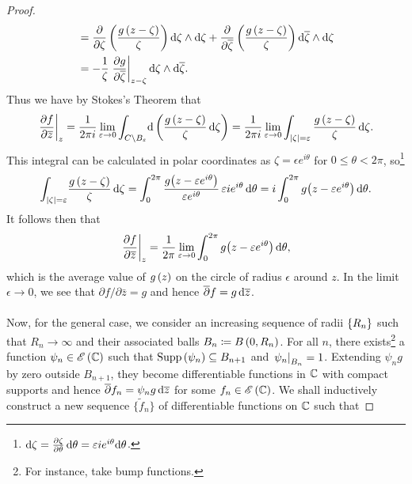 \documentclass[../Moduli_Spaces_of_Riemann_Surfaces.tex]{subfiles}
\begin{document}
\begin{proof}
\begin{equation*}
\begin{aligned}
                   &=\frac{\partial}{\partial\zeta}\left(\frac{g\left(z-\zeta\right)}{\zeta}\right)\mathrm{d}\zeta\wedge\mathrm{d}\zeta+\frac{\partial}{\partial\overline{\zeta}}\left(\frac{g\left(z-\zeta\right)}{\zeta}\right)\mathrm{d}\overline{\zeta}\wedge\mathrm{d}\zeta \\
                   &=-\frac{1}{\zeta}\left.\frac{\partial g}{\partial\overline{\zeta}}\right|_{z-\zeta}\mathrm{d}\zeta\wedge\mathrm{d}\overline{\zeta}.
            \end{aligned}
        \end{equation*}
        Thus we have by Stokes's Theorem that
        \begin{equation*}
            \left.\frac{\partial f}{\partial\overline{z}}\right|_z=\frac{1}{2\pi i}\lim\limits_{\varepsilon\to0}\int_{C\setminus B_\varepsilon}\!\mathrm{d}\left(\frac{g\left(z-\zeta\right)}{\zeta}\,\mathrm{d}\zeta\right)=\frac{1}{2\pi i}\lim\limits_{\varepsilon\to0}\int_{\left|\zeta\right|=\varepsilon}\frac{g\left(z-\zeta\right)}{\zeta}\,\mathrm{d}\zeta.
        \end{equation*}
        This integral can be calculated in polar coordinates as $\zeta=\epsilon e^{i\theta}$ for $0\leq\theta<2\pi$, so\footnote{$\mathrm{d}\zeta=\frac{\partial\zeta}{\partial\theta}\,\mathrm{d}\theta=\varepsilon ie^{i\theta}\mathrm{d}\theta$.}
        \begin{equation*}
            \int_{\left|\zeta\right|=\varepsilon}\!\frac{g\left(z-\zeta\right)}{\zeta}\,\mathrm{d}\zeta=\int_{0}^{2\pi}\frac{g\big(z-\varepsilon e^{i\theta}\big)}{\varepsilon e^{i\theta}}\,\varepsilon ie^{i\theta}\,\mathrm{d}\theta=i\int_{0}^{2\pi}g\big(z-\varepsilon e^{i\theta}\big)\,\mathrm{d}\theta.
        \end{equation*}
        It follows then that
        \begin{equation*}
            \left.\frac{\partial f}{\partial\overline{z}}\right|_z=\frac{1}{2\pi}\lim\limits_{\varepsilon\to0}\int_{0}^{2\pi}g\big(z-\varepsilon e^{i\theta}\big)\,\mathrm{d}\theta,
        \end{equation*}
        which is the average value of $g\left(z\right)$ on the circle of radius $\epsilon$ around $z$. In the limit $\epsilon\to0$, we see that $\partial f/\partial\bar{z}=g$ and hence $\overline{\partial}f=g\,\mathrm{d}\overline{z}$.\\\ \\
        Now, for the general case, we consider an increasing sequence of radii $\left\{R_n\right\}$ such that $R_n\to\infty$ and their associated balls $B_n\coloneqq B\left(0,R_n\right)$. For all $n$, there exists\footnote{For instance, take bump functions.} a function $\psi_n\in\mathscr{E}\left(\mathbb{C}\right)$ such that $\operatorname{Supp}\left(\psi_n\right)\subseteq B_{n+1}$ and $\left.\psi_n\right|_{B_n}=1$. Extending $\psi_ng$ by zero outside $B_{n+1}$, they become differentiable functions in $\mathbb{C}$ with compact supports and hence $\overline{\partial}f_n=\psi_ng\,\mathrm{d}\overline{z}$ for some $f_n\in\mathscr{E}\left(\mathbb{C}\right)$. We shall inductively construct a new sequence $\big\{\tilde{f}_n\big\}$ of differentiable functions on $\mathbb{C}$ such that

\end{proof}
\end{document}
